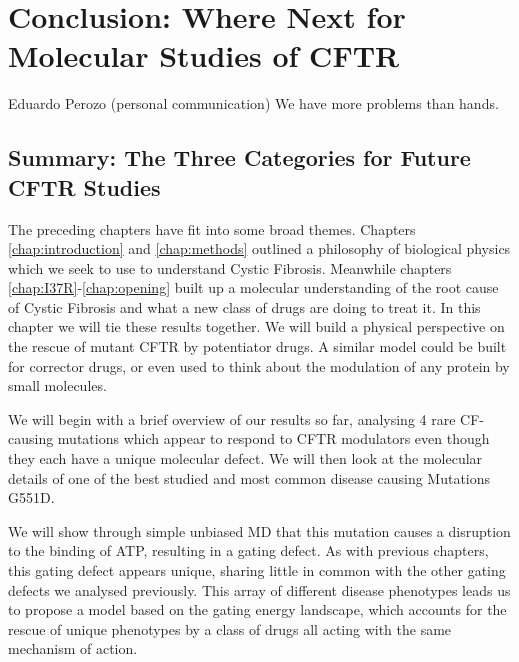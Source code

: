 \chapter{Conclusion: Where Next for Molecular Studies of CFTR}
\label{chap:conclusion}
\begin{chapquote} {Eduardo Perozo (personal communication)}
We have more problems than hands. 
\end{chapquote}


\section{Summary: The Three Categories for Future CFTR Studies}

The preceding chapters have fit into some broad themes. Chapters \ref{chap:introduction} and \ref{chap:methods} outlined a philosophy of biological physics which we seek to use to understand Cystic Fibrosis. Meanwhile chapters \ref{chap:I37R}-\ref{chap:opening} built up a molecular understanding of the root cause of Cystic Fibrosis and what a new class of drugs are doing to treat it. In this chapter we will tie these results together. We will build a physical perspective on the rescue of mutant CFTR by potentiator drugs. A similar model could be built for corrector drugs, or even used to think about the modulation of any protein by small molecules.


We will begin with a brief overview of our results so far, analysing 4 rare CF-causing mutations which appear to respond to CFTR modulators even though they each have a unique molecular defect. We will then look at the molecular details of one of the best studied and most common disease causing Mutations G551D. 

We will show through simple unbiased MD that this mutation causes a disruption to the binding of ATP, resulting in a gating defect. As with previous chapters, this gating defect appears unique, sharing little in common with the other gating defects we analysed previously. This array of different disease phenotypes leads us to propose a model based on the gating energy landscape, which accounts for the rescue of unique phenotypes by a class of drugs all acting with the same mechanism of action. 



